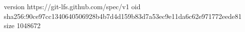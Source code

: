 version https://git-lfs.github.com/spec/v1
oid sha256:90ce97cc1340640506928b4b7d4d159b83d7a53ec9e11da6c62e971772eede81
size 1048672
